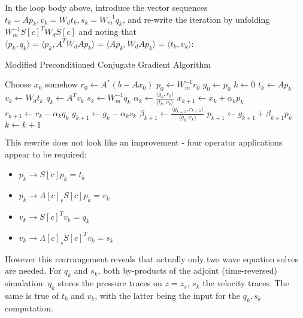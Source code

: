 In the loop body above, introduce the vector sequences $t_k=Ap_k,v_k=W_d t_k, s_k=W_m^{-1}q_k$, and re-write the iteration by unfolding $W_m^{-1}S[c]^T W_d S[c]$ and noting that $\langle p_k, q_k \rangle =\langle p_k,A^TW_dAp_k \rangle =\langle Ap_k,W_dAp_k \rangle =\langle t_k,v_k\rangle$: 
\begin{algorithm}[H]
\caption{Modified Preconditioned Conjugate Gradient Algorithm}
\begin{algorithmic}[1]
\State Choose $x_0$ somehow
  \State $r_0 \gets A^*(b-Ax_0)$
  \State $p_0 \gets W_m^{-1}r_0$
  \State $g_0 \gets p_0$
  \State $k \gets 0$
  \Repeat
  \State $t_k \gets Ap_k$
  \State $v_k \gets W_dt_k$
  \State $q_k \gets A^Tv_k$
  \State $s_k \gets W_m^{-1}q_k$
  \State $\alpha_k \gets \frac{\langle g_k,r_k \rangle}{\langle t_k,v_k\rangle}$
  \State $x_{k+1} \gets x_k + \alpha_k p_k$
  \State $r_{k+1} \gets r_k - \alpha_kq_k$
  \State $g_{k+1} \gets g_k - \alpha_k s_k$
  \State $\beta_{k+1} \gets \frac{\langle g_{k+1},r_{k+1}\rangle}{\langle g_k,r_k\rangle}$
  \State $p_{k+1}\gets g_{k+1}+\beta_{k+1}p_k$
  \State $k \gets k+1$
\end{algorithmic}
\end{algorithm}
This rewrite does not look like an improvement - four operator applications appear to be required:
\begin{itemize}
\item $p_k \rightarrow S[c] p_k = t_k$
\item $p_k \rightarrow  \Lambda[c]_r S[c] p_k = v_k$
\item $v_k \rightarrow S[c]^Tv_k = q_k$
\item $v_k \rightarrow \Lambda[c]_s S[c]^T v_k = s_k$
\end{itemize}
However this rearrangement reveals that actually only two wave equation solves are needed. For $q_k$ and $s_k$, both by-products of the adjoint (time-reversed) simulation: $q_k$ stores the pressure traces on $z=z_s$, $s_k$ the velocity traces. The same is true of $t_k$ and $v_k$, with the latter being the input for the $q_k,s_k$ computation.

